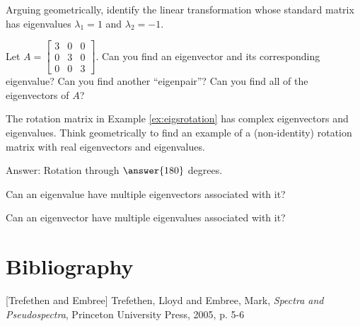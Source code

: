 \documentclass{ximera}
\begin{document}
\begin{problem}\label{prob:eigenvalgeometry}
Arguing geometrically, identify the linear transformation whose standard matrix has eigenvalues $\lambda_1=1$ and $\lambda_2=-1$.
\begin{multipleChoice}
  \end{multipleChoice}
\end{problem}

\begin{problem}\label{prob:eigvalvectorsofdiagmat} Let $A=\begin{bmatrix} 3&0&0\\0&3&0\\0&0&3\end{bmatrix}$.  Can you find an eigenvector and its corresponding eigenvalue?  Can you find another ``eigenpair''?  Can you find all of the eigenvectors of $A$?
\end{problem}

\begin{problem}\label{prob:rotmatrixrealeig1}The rotation matrix in Example \ref{ex:eigsrotation} has complex eigenvectors and eigenvalues.  Think geometrically to find an example of a (non-identity) rotation matrix with real eigenvectors and eigenvalues.

Answer:  Rotation through $\answer{180}$ degrees.
\end{problem}

\begin{problem}\label{prob:eigenmultchoice}
Can an eigenvalue have multiple eigenvectors associated with it? 
\begin{multipleChoice}
    \end{multipleChoice}
    
 Can an eigenvector have multiple eigenvalues associated with it?
 \begin{multipleChoice}
    \end{multipleChoice}
\end{problem}
\section*{Bibliography}
[Trefethen and  Embree] Trefethen, Lloyd and Embree, Mark, {\it Spectra and Pseudospectra}, Princeton University Press, 2005, p. 5-6
\end{document}
